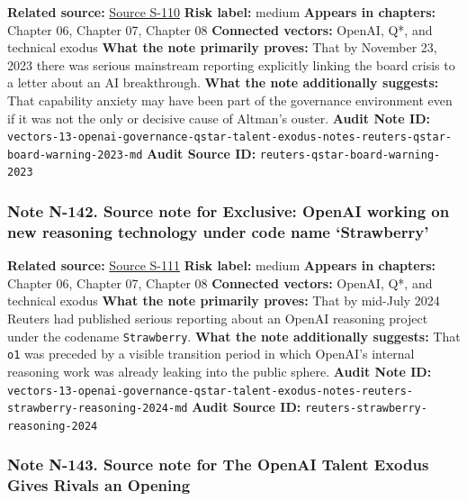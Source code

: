 \documentclass[
  american,
  11pt,
  letterpaper,
]{article}
\begin{document}
\textbf{Related source:}
\hyperref[source-s-110-openai-researchers-warned-board-of-ai-breakthrough-ahead-of-ceo-ouster-sources-say]{Source
S-110} \textbf{Risk label:} medium \textbf{Appears in chapters:} Chapter
06, Chapter 07, Chapter 08 \textbf{Connected vectors:} OpenAI, Q*, and
technical exodus \textbf{What the note primarily proves:} That by
November 23, 2023 there was serious mainstream reporting explicitly
linking the board crisis to a letter about an AI breakthrough.
\textbf{What the note additionally suggests:} That capability anxiety
may have been part of the governance environment even if it was not the
only or decisive cause of Altman's ouster. \textbf{Audit Note ID:}
\texttt{vectors-13-openai-governance-qstar-talent-exodus-notes-reuters-qstar-board-warning-2023-md}
\textbf{Audit Source ID:} \texttt{reuters-qstar-board-warning-2023}

\subsubsection{Note N-142. Source note for Exclusive: OpenAI working on
new reasoning technology under code name
`Strawberry'}\label{note-n-142-vectors-13-openai-governance-qstar-talent-exodus-notes-reuters-strawberry-reasoning-2024-md}

\textbf{Related source:}
\hyperref[source-s-111-exclusive-openai-working-on-new-reasoning-technology-under-code-name-strawberry]{Source
S-111} \textbf{Risk label:} medium \textbf{Appears in chapters:} Chapter
06, Chapter 07, Chapter 08 \textbf{Connected vectors:} OpenAI, Q*, and
technical exodus \textbf{What the note primarily proves:} That by
mid-July 2024 Reuters had published serious reporting about an OpenAI
reasoning project under the codename \texttt{Strawberry}. \textbf{What
the note additionally suggests:} That \texttt{o1} was preceded by a
visible transition period in which OpenAI's internal reasoning work was
already leaking into the public sphere. \textbf{Audit Note ID:}
\texttt{vectors-13-openai-governance-qstar-talent-exodus-notes-reuters-strawberry-reasoning-2024-md}
\textbf{Audit Source ID:} \texttt{reuters-strawberry-reasoning-2024}

\subsubsection{Note N-143. Source note for The OpenAI Talent Exodus
Gives Rivals an
Opening}\label{note-n-143-vectors-13-openai-governance-qstar-talent-exodus-notes-wired-openai-talent-exodus-2024-md}
\end{document}
